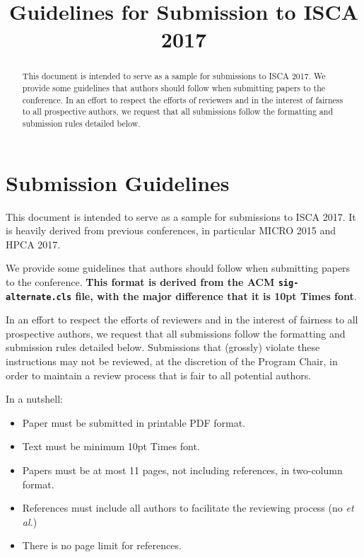 \documentclass{sig-alternate}
\title{Guidelines for Submission to ISCA 2017}
\author{}
\begin{document}
\maketitle
\thispagestyle{firstpage}
\pagestyle{plain}

\begin{abstract}

This document is intended to serve as a sample for submissions to ISCA 2017. We provide some guidelines that authors should follow when submitting papers to the conference. In an effort to respect the efforts of reviewers and in the interest of fairness to all prospective authors, we request that all submissions follow the formatting and submission rules detailed below. 

\end{abstract}

\section{Submission Guidelines}

This document is intended to serve as a sample for submissions to ISCA 2017. It is heavily derived from previous conferences, in particular MICRO 2015 and HPCA 2017.

We provide some guidelines that authors should follow when submitting papers to the conference. \textbf{This format is derived from the ACM \texttt{sig-alternate.cls} file, with the major difference that it is 10pt Times font}.

In an effort to respect the efforts of reviewers and in the interest of fairness to all prospective authors, we request that all submissions follow the formatting and submission rules detailed below. Submissions that (grossly) violate these instructions may not be reviewed, at the discretion of the Program Chair, in order to maintain a review process that is fair to all potential authors.

\vspace{1ex}In a nutshell:

\begin{itemize}
\item Paper must be submitted in printable PDF format.
\item Text must be minimum 10pt Times font.
\item Papers must be at most 11 pages, not including references, in two-column format.
\item References must include all authors to facilitate the reviewing process (no \emph{et al.})
\item There is no page limit for references.
\end{itemize}
\end{document}
